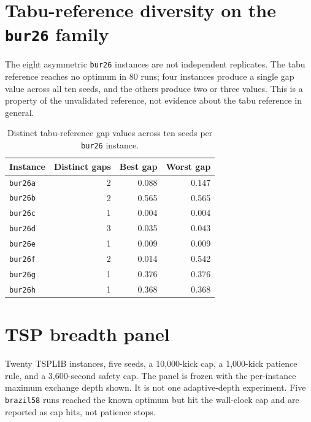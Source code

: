 \documentclass[10pt]{article}
\begin{document}
\section{Tabu-reference diversity on the \texttt{bur26} family}

The eight asymmetric \texttt{bur26} instances are not independent replicates. The tabu reference
reaches no optimum in 80 runs; four instances produce a single gap value across all ten seeds, and the
others produce two or three values. This is a property of the unvalidated reference, not evidence about
the tabu reference in general.

\begin{table}[H]
\centering
\caption{Distinct tabu-reference gap values across ten seeds per \texttt{bur26} instance.}
\small
\begin{tabular}{lrrr}
\toprule
Instance & Distinct gaps & Best gap & Worst gap \\
\midrule
\texttt{bur26a} & 2 & 0.088 & 0.147 \\
\texttt{bur26b} & 2 & 0.565 & 0.565 \\
\texttt{bur26c} & 1 & 0.004 & 0.004 \\
\texttt{bur26d} & 3 & 0.035 & 0.043 \\
\texttt{bur26e} & 1 & 0.009 & 0.009 \\
\texttt{bur26f} & 2 & 0.014 & 0.542 \\
\texttt{bur26g} & 1 & 0.376 & 0.376 \\
\texttt{bur26h} & 1 & 0.368 & 0.368 \\
\bottomrule
\end{tabular}
\end{table}

\section{TSP breadth panel}

Twenty TSPLIB instances, five seeds, a 10,000-kick cap, a 1,000-kick patience rule, and a
3,600-second safety cap. The panel is frozen with the per-instance maximum exchange depth shown.
It is not one adaptive-depth experiment. Five \texttt{brazil58} runs reached the known optimum but
hit the wall-clock cap and are reported as cap hits, not patience stops.
\end{document}
